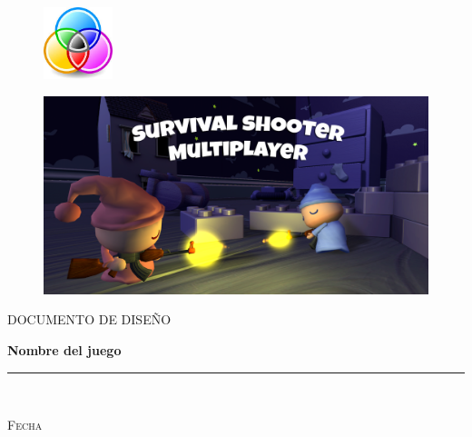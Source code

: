 \documentclass[a4paper,12pt]{book}
\begin{document}
\begin{titlepage}
	
	\begin{center}
		\vspace*{-2in}
		\begin{figure}[htb]
			\includegraphics[width=2cm,right]{./images/logo_empresa.png}
		\end{figure}
	
		\vspace*{0.5in}
		\begin{figure}[htb]
			\begin{center}
				\includegraphics[width=15cm]{./images/cover_juego.png}
			\end{center}
		\end{figure}
		
		\vspace*{0.65in}

		\begin{large}
			DOCUMENTO DE DISEÑO\\
		\end{large}
		\vspace*{0.2in}
		\begin{Large}
			\textbf{Nombre del juego} \\ 
		\end{Large}
		\vspace*{1in}

		\rule{80mm}{0.1mm}\\
		\vspace*{0.3in}
	\end{center}
	\begin{large}
		\begin{minipage}{10cm}			
			\textsc{Fecha}
	

\end{minipage}
\end{large}
\end{titlepage}
\end{document}
